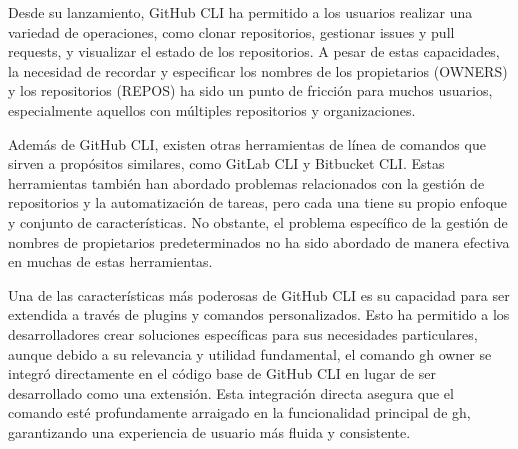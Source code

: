 Desde su lanzamiento, GitHub CLI ha permitido a los usuarios realizar una variedad de operaciones, como clonar repositorios, gestionar issues y pull requests, y visualizar el estado de los repositorios. A pesar de estas capacidades, la necesidad de recordar y especificar los nombres de los propietarios (OWNERS) y los repositorios (REPOS) ha sido un punto de fricción para muchos usuarios, especialmente aquellos con múltiples repositorios y organizaciones.

Además de GitHub CLI, existen otras herramientas de línea de comandos que sirven a propósitos similares, como GitLab CLI y Bitbucket CLI. Estas herramientas también han abordado problemas relacionados con la gestión de repositorios y la automatización de tareas, pero cada una tiene su propio enfoque y conjunto de características. No obstante, el problema específico de la gestión de nombres de propietarios predeterminados no ha sido abordado de manera efectiva en muchas de estas herramientas.

Una de las características más poderosas de GitHub CLI es su capacidad para ser extendida a través de plugins y comandos personalizados. Esto ha permitido a los desarrolladores crear soluciones específicas para sus necesidades particulares, aunque debido a su relevancia y utilidad fundamental, el comando gh owner se integró directamente en el código base de GitHub CLI en lugar de ser desarrollado como una extensión. Esta integración directa asegura que el comando esté profundamente arraigado en la funcionalidad principal de gh, garantizando una experiencia de usuario más fluida y consistente.
